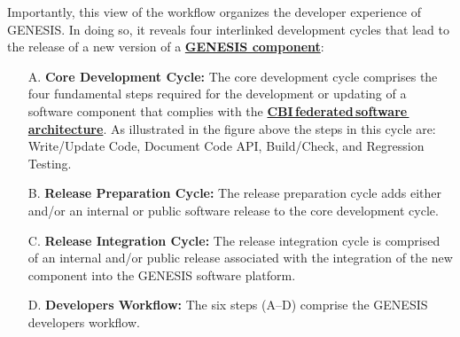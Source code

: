 \documentclass[12pt]{article}
\begin{document}
Importantly, this view of the workflow organizes the developer experience of GENESIS. In doing so, it reveals four interlinked development cycles that lead to the release of a new version of a \href{../reserved-words/reserved-words.tex}{\bf GENESIS component}:
\begin{itemize}
   \item[A.]{\bf Core Development Cycle:} The core development cycle comprises the four fundamental steps required for the development or updating of a software component that complies with the \href{../genesis-overview/genesis-overview.tex}{\bf CBI\,federated\,software\,architecture}. As illustrated in the figure above the steps in this cycle are: Write/Update Code, Document Code API, Build/Check, and Regression Testing.
   \item[B.]{\bf Release Preparation Cycle:} The release preparation cycle adds either and/or an internal or public software release to the core development cycle.
   \item[C.]{\bf Release Integration Cycle:} The release integration cycle is comprised of an internal and/or public release associated with the integration of the new component into the GENESIS software platform.
   \item[D.]{\bf Developers Workflow:} The six steps (A--D) comprise the GENESIS developers workflow.
\end{itemize}
\end{document}
